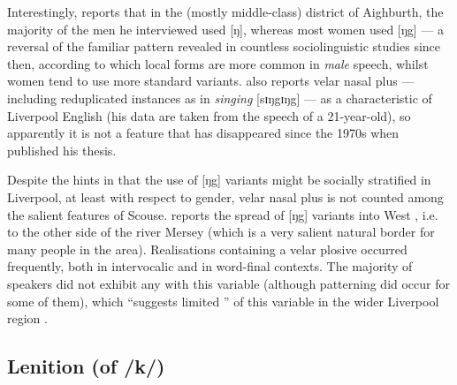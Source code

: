 Interestingly, \citeauthor{knowles1973} reports that in the (mostly middle-class) district of Aighburth, the majority of the men he interviewed used [ŋ], whereas most women used [ŋg] \citeyearpar[cf.][295]{knowles1973} --- a reversal of the familiar pattern revealed in countless sociolinguistic studies since then, according to which local forms are more common in \emph{male} speech, whilst women tend to use more standard variants.
\citet[352]{watson2007} also reports velar nasal plus --- including reduplicated instances as in \emph{singing} [sɪŋgɪŋg] --- as a characteristic of Liverpool English (his data are taken from the speech of a 21-year-old), so apparently it is not a feature that has disappeared since the 1970s when \citeauthor{knowles1973} published his thesis.

Despite the hints in \textcite{knowles1973} that the use of [ŋg] variants might be socially stratified in Liverpool, at least with respect to gender, velar nasal plus is not counted among the salient features of Scouse.
\textcite[98]{newbrook1999} reports the spread of [ŋg] variants into West , i.e. to the other side of the river Mersey (which is a very salient natural border for many people in the area).
Realisations containing a velar plosive occurred frequently, both in intervocalic and in word-final contexts.
The majority of speakers did not exhibit any  with this variable (although  patterning did occur for some of them), which ``suggests limited '' of this variable in the wider Liverpool region \parencite[98]{newbrook1999}.

		\subsection{Lenition (of /k/)}\label{sec.var.con.len}

